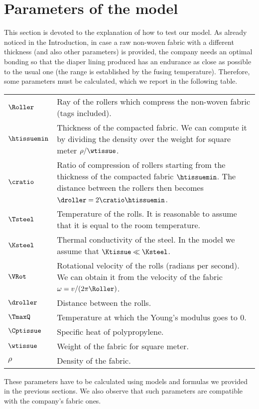 
\section{Parameters of the model}
\label{parametersmodel}
This section is devoted to the explanation of how to test our model. As already noticed in the Introduction, in case a raw non-woven fabric with a different thickness (and also other parameters) is provided, the company needs an optimal bonding so that the diaper lining produced has an endurance as close as possible to the usual one (the range is established by the fusing temperature). Therefore, some parameters must be calculated, which we report in the following table.

\begin{center}
\begin{tabular}{|l|p{12cm}|}
  \hline
  $\Roller$ & Ray of the rollers which compress the non-woven fabric (tags included).
  \\
  $\htissuemin$ &
  Thickness of the compacted fabric. We can compute it by dividing the density over the weight for square meter $\rho/\wtissue$.
  \\
  $\cratio$ &
  Ratio of compression of rollers starting from the thickness of the compacted fabric $\htissuemin$.
  The distance between the rollers then becomes $\droller=2\cratio\htissuemin$.
  \\
  $\Tsteel$ & Temperature of the rolls. It is reasonable to assume that it is equal to the room temperature.
  \\
  $\Ksteel$ & Thermal conductivity of the steel. In the model we assume that $\Ktissue\ll \Ksteel$.
  \\
  $\VRot$ &
  Rotational velocity of the rolls (radians per second). We can obtain it from the velocity of the fabric $\omega =v/(2\pi\Roller)$.
  \\
  $\droller$ &
  Distance between the rolls.
  \\
  $\TmaxQ$ &
  Temperature at which the Young's modulus goes to $0$.
  \\
  $\Cptissue$ &
  Specific heat of polypropylene.
  \\
  $\wtissue$ &
  Weight of the fabric for square meter.
  \\
  $\rho$ & Density of the fabric.\\
  \hline
\end{tabular}
\end{center}

These parameters have to be calculated using models and formulas we provided in the previous sections. We also observe that such parameters are compatible with the company's fabric ones.